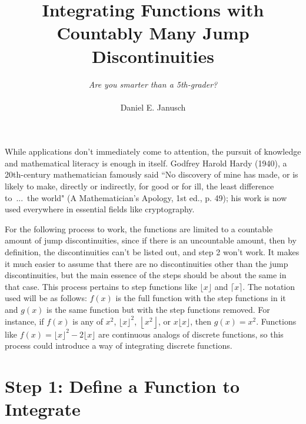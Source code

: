 \documentclass[12pt]{article}
\begin{document}
\title{Integrating Functions with Countably Many Jump Discontinuities}
\author{
	\emph{Are you smarter than a 5th-grader?}\\
	\\
	Daniel E. Janusch
}

\maketitle

	While applications don't immediately come to attention, the pursuit of knowledge and mathematical literacy
	is enough in itself. Godfrey Harold Hardy (1940), a 20th-century mathematician famously said ``No discovery
	of mine has made, or is likely to make, directly or indirectly, for good or for ill, the least difference
	to~...~the world" (A Mathematician's Apology, 1st ed., p. 49); his work is now used everywhere in essential
	fields like cryptography.

	For the following process to work, the functions are limited to a countable amount of jump discontinuities,
	since if there is an uncountable amount, then by definition, the discontinuities can't be listed out, and
	step 2 won't work. It makes it much easier to assume that there are no discontinuities other than the jump
	discontinuities, but the main essence of the steps should be about the same in that case. This process
	pertains to step functions like $\lfloor x\rfloor$ and $\lceil x\rceil$. The notation used will be as
	follows: $f(x)$ is the full function with the step functions in it and  $g(x)$ is the same function but
	with the step functions removed. For instance, if $f(x)$ is any of $x^2$, $\lfloor x\rfloor^2$,
	$\left\lfloor x^2\right\rfloor$, or $x\lfloor x\rfloor$, then $g(x)=x^2$. Functions like
	$f(x)=\lfloor x\rfloor^2-2\lfloor x\rfloor$ are continuous analogs of discrete functions, so this process
	could introduce a way of integrating discrete functions.

\section*{Step 1: Define a Function to Integrate}
\end{document}
